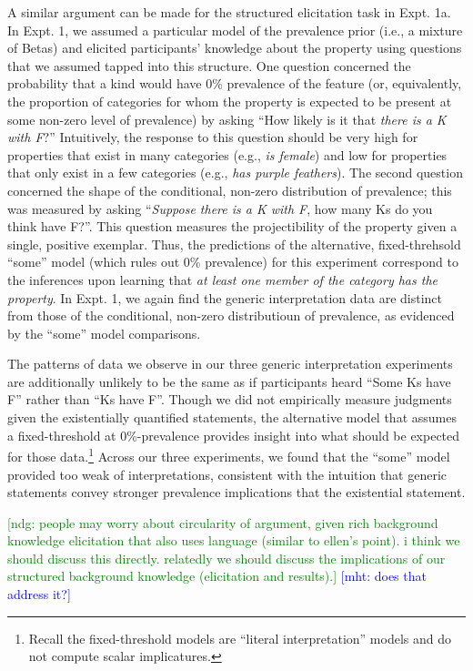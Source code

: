 \documentclass[,man,floatsintext]{apa6}
\let\rmarkdownfootnote\footnote%
\def\footnote{\protect\rmarkdownfootnote}
\theoremstyle{definition}
\theoremstyle{definition}
\theoremstyle{definition}
\theoremstyle{remark}
\begin{document}
A similar argument can be made for the structured elicitation task in
Expt. 1a. In Expt. 1, we assumed a particular model of the prevalence
prior (i.e., a mixture of Betas) and elicited participants' knowledge
about the property using questions that we assumed tapped into this
structure. One question concerned the probability that a kind would have
0\% prevalence of the feature (or, equivalently, the proportion of
categories for whom the property is expected to be present at some
non-zero level of prevalence) by asking \enquote{How likely is it that
\emph{there is a K with F}?} Intuitively, the response to this question
should be very high for properties that exist in many categories (e.g.,
\emph{is female}) and low for properties that only exist in a few
categories (e.g., \emph{has purple feathers}). The second question
concerned the shape of the conditional, non-zero distribution of
prevalence; this was measured by asking \enquote{\emph{Suppose there is
a K with F}, how many Ks do you think have F?}. This question measures
the projectibility of the property given a single, positive exemplar.
Thus, the predictions of the alternative, fixed-threhsold \enquote{some}
model (which rules out 0\% prevalence) for this experiment correspond to
the inferences upon learning that \emph{at least one member of the
category has the property}. In Expt. 1, we again find the generic
interpretation data are distinct from those of the conditional, non-zero
distributioun of prevalence, as evidenced by the \enquote{some} model
comparisons.

The patterns of data we observe in our three generic interpretation
experiments are additionally unlikely to be the same as if participants
heard \enquote{Some Ks have F} rather than \enquote{Ks have F}. Though
we did not empirically measure judgments given the existentially
quantified statements, the alternative model that assumes a
fixed-threshold at 0\%-prevalence provides insight into what should be
expected for those data.\footnote{Recall the fixed-threshold models are
  \enquote{literal interpretation} models and do not compute scalar
  implicatures.} Across our three experiments, we found that the
\enquote{some} model provided too weak of interpretations, consistent
with the intuition that generic statements convey stronger prevalence
implications that the existential statement.

{\textcolor{Green}{[ndg: people may worry about circularity of argument, given rich background knowledge elicitation that also uses language (similar to ellen's point). i think we should discuss this directly. relatedly we should discuss the implications of our structured background knowledge (elicitation and results).]}}
{\textcolor{Blue}{[mht: does that address it?]}}
\end{document}
